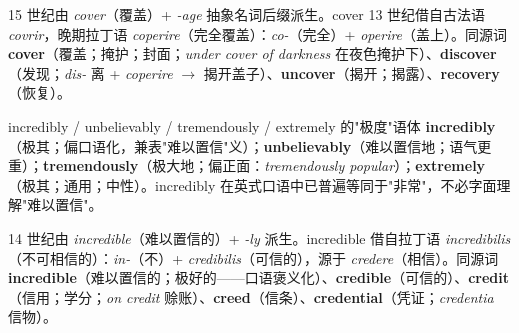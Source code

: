 \documentclass[../main.tex]{subfiles}
\begin{document}
\begin{origin}
15 世纪由 \textit{cover}（覆盖）+ \textit{-age} 抽象名词后缀派生。cover 13 世纪借自古法语 \textit{covrir}，晚期拉丁语 \textit{coperire}（完全覆盖）：\textit{co-}（完全）+ \textit{operire}（盖上）。同源词 \textbf{cover}（覆盖；掩护；封面；\textit{under cover of darkness} 在夜色掩护下）、\textbf{discover}（发现；\textit{dis-} 离 + \textit{coperire} $\to$ 揭开盖子）、\textbf{uncover}（揭开；揭露）、\textbf{recovery}（恢复）。
\end{origin}




\begin{gram}{incredibly / unbelievably / tremendously / extremely 的"极度"语体}
\textbf{incredibly}（极其；偏口语化，兼表"难以置信"义）；\textbf{unbelievably}（难以置信地；语气更重）；\textbf{tremendously}（极大地；偏正面：\textit{tremendously popular}）；\textbf{extremely}（极其；通用；中性）。incredibly 在英式口语中已普遍等同于"非常"，不必字面理解"难以置信"。
\end{gram}

\begin{origin}
14 世纪由 \textit{incredible}（难以置信的）+ \textit{-ly} 派生。incredible 借自拉丁语 \textit{incredibilis}（不可相信的）：\textit{in-}（不）+ \textit{credibilis}（可信的），源于 \textit{credere}（相信）。同源词 \textbf{incredible}（难以置信的；极好的——口语褒义化）、\textbf{credible}（可信的）、\textbf{credit}（信用；学分；\textit{on credit} 赊账）、\textbf{creed}（信条）、\textbf{credential}（凭证；\textit{credentia} 信物）。
\end{origin}



\end{document}
